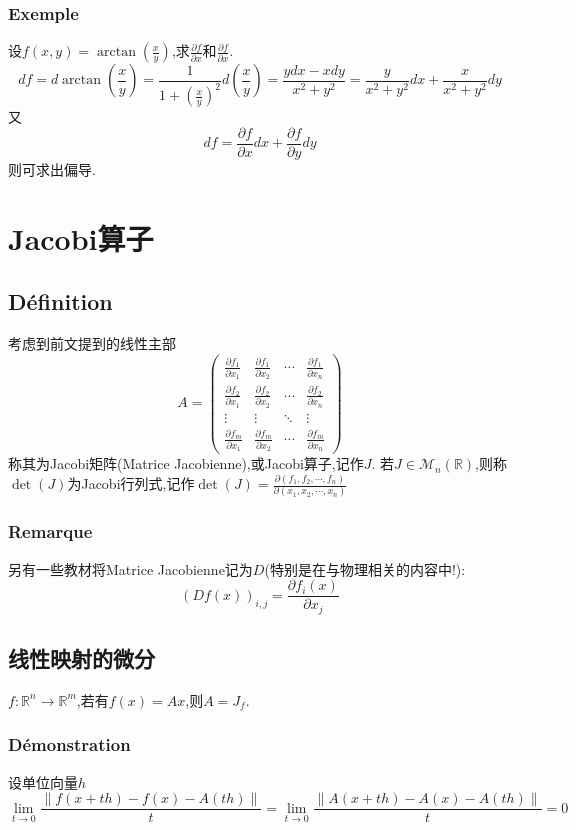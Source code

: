\documentclass[12pt, a4paper, oneside]{ctexbook}
\begin{document}
    \subsubsection{Exemple}
    设$f(x,y)=\arctan(\frac{x}{y})$,求$\frac{\partial f}{\partial x}$和$\frac{\partial f}{\partial x}$.\\


    $$df=d \arctan(\frac{x}{y})=\frac{1}{1+(\frac{x}{y})^2}d(\frac{x}{y})=\frac{ydx-xdy}{x^2+y^2}=\frac{y}{x^2+y^2}dx+\frac{x}{x^2+y^2}dy$$
    又
    $$df=\frac{\partial f}{\partial x}dx+ \frac{\partial f}{\partial y}dy$$
    则可求出偏导.
\section{Jacobi算子}
    \subsection{Définition}
    考虑到前文提到的线性主部
    $$
     A=\begin{pmatrix}
      \frac{\partial f_1}{\partial x_1}&\frac{\partial f_1}{\partial x_2}  &\cdots  &\frac{\partial f_1}{\partial x_n} \\
      \frac{\partial f_2}{\partial x_1}&\frac{\partial f_2}{\partial x_2}  & \cdots & \frac{\partial f_2}{\partial x_n}\\ 
      \vdots& \vdots & \ddots  & \vdots\\
      \frac{\partial f_m}{\partial x_1}&\frac{\partial f_m}{\partial x_2} &\cdots & \frac{\partial f_m}{\partial x_n} 
     \end{pmatrix}
    $$
    称其为Jacobi矩阵(Matrice Jacobienne),或Jacobi算子,记作$J$.
    若$J\in\mathcal{M}_n(\mathbb{R}) $,则称$\det(J)$为Jacobi行列式,记作$\det(J)=\frac{\partial(f_1,f_2,\cdots,f_n)}{\partial(x_1,x_2,\cdots,x_n)}$
    \subsubsection{Remarque}
    另有一些教材将Matrice Jacobienne记为$D$(特别是在与物理相关的内容中!):
    $$
     (Df(x))_{i,j}=\frac{\partial f_i(x)}{\partial x_j}
    $$
    \subsection{线性映射的微分}
    $f:\mathbb{R}^n\rightarrow \mathbb{R}^m$,若有$f(x)=Ax$,则$A=J_f$.
    \subsubsection{Démonstration}
    设单位向量$h$
    $$
      \lim_{t \to 0}\frac{\left\lVert f(x+th)-f(x)-A(th) \right\rVert }{t}  =\lim_{t \to 0}\frac{\left\lVert A(x+th)-A(x)-A(th) \right\rVert }{t} =0 
    $$
\end{document}
